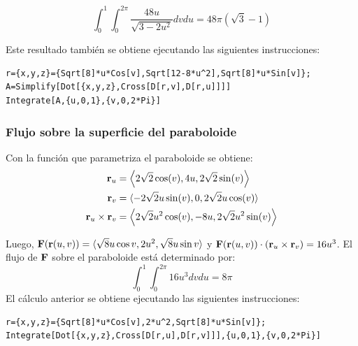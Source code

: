 \begin{parrafonumerado}
\begin{equation}\label{flujo12}
\int_0^1\int_0^{2\pi}\frac{48u}{\sqrt{3-2u^2}} dvdu= 48\pi (\sqrt{3}-1)
\end{equation}

Este resultado también se obtiene ejecutando  las siguientes instrucciones:

\begin{tcolorbox}[title=\bf Instrucción \verb"Mathematica"]\begin{Verbatim}[formatcom=\letraverbatim]
r={x,y,z}={Sqrt[8]*u*Cos[v],Sqrt[12-8*u^2],Sqrt[8]*u*Sin[v]};
A=Simplify[Dot[{x,y,z},Cross[D[r,v],D[r,u]]]]
Integrate[A,{u,0,1},{v,0,2*Pi}]
\end{Verbatim}
\end{tcolorbox}

\subsubsection{Flujo sobre la superficie del paraboloide}

Con la función que parametriza el paraboloide se obtiene:
\begin{align*}
{\bf r}_u &= \left \langle 2 \sqrt{2}\cos(v), 4u,2\sqrt{2}\sin(v) \right \rangle \\
{\bf r}_v &=\langle -2\sqrt{2}u\sin(v),0,2\sqrt{2}u\cos(v) \rangle \\
{\bf r}_u \times {\bf r}_v &= \left \langle 2\sqrt{2}u^2 \cos(v),-8u,2\sqrt{2}u^2 \sin(v) \right\rangle
\end{align*}

Luego, ${\bf F}({\bf r}(u,v)) = \langle \sqrt{8}u \cos v ,2u^2 ,\sqrt{8}u\sin v \rangle$ y
${\bf F}({\bf r}(u,v))\cdot({\bf r}_u \times {\bf r}_v)=16u^3 $.
El flujo de ${\bf F}$ sobre el paraboloide está determinado por:
\begin{equation}\label{flujo11}
\int_0^1\int_0^{2\pi } 16 u^3 dvdu= 8\pi
\end{equation}
El cálculo anterior se obtiene ejecutando las siguientes instrucciones:

\begin{tcolorbox}[title=\bf Instrucción \verb"Mathematica"]\begin{Verbatim}[formatcom=\letraverbatim]
r={x,y,z}={Sqrt[8]*u*Cos[v],2*u^2,Sqrt[8]*u*Sin[v]};
Integrate[Dot[{x,y,z},Cross[D[r,u],D[r,v]]],{u,0,1},{v,0,2*Pi}]
\end{Verbatim}
\end{tcolorbox}


\end{parrafonumerado}
